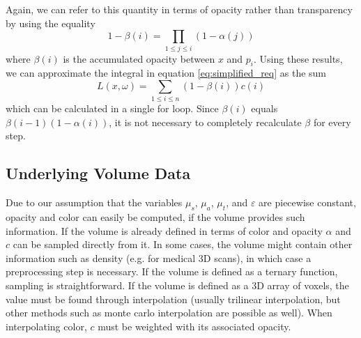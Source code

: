 Again, we can refer to this quantity in terms of opacity rather than transparency by using the equality
\begin{equation}
1 - \beta(i) = \prod_{1 \le j \le i} (1 - \alpha(j))
\end{equation}
where $\beta(i)$ is the accumulated opacity between ${x}$ and $p_i$.
Using these results, we can approximate the integral in equation \ref{eq:simplified_req} as the sum
\begin{equation} \label{eq:discrete_approximation}
L({x},\omega) = \sum_{1 \le i \le n}(1 - \beta(i))c(i)
\end{equation}
which can be calculated in a single for loop\cite{10.1145/147130.147155}. Since $\beta(i)$ equals $\beta(i-1)(1-\alpha(i))$, it is not necessary to completely recalculate $\beta$ for every step.


\subsection{Underlying Volume Data}
Due to our assumption that the variables $\mu_s$, $\mu_a$, $\mu_t$, and $\varepsilon$ are piecewise constant, opacity and color can easily be computed, if the volume provides such information. If the volume is already defined in terms of color and opacity $\alpha$ and $c$ can be sampled directly from it.
In some cases, the volume might contain other information such as density (e.g. for medical 3D scans), in which case a preprocessing step\cite{511} is necessary.
If the volume is defined as a ternary function, sampling is straightforward. If the volume is defined as a 3D array of voxels, the value must be found through interpolation (usually trilinear interpolation\cite{511}, but other methods such as monte carlo interpolation\cite{10.1145/3451256} are possible as well).
When interpolating color, $c$ must be weighted with its associated opacity\cite{729595}.

